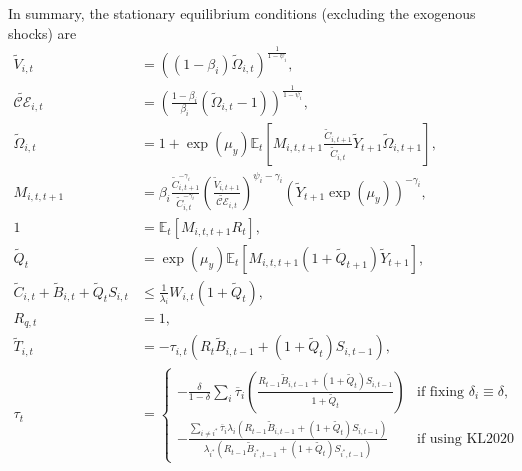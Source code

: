 \documentclass[12 pt, oneside]{article}
\theoremstyle{definition}
\theoremstyle{definition}
\theoremstyle{definition}
\newcommand{\E}{\mathbb{E}}
\newcommand{\calC}{\mathcal{C}}
\newcommand{\calE}{\mathcal{E}}
\begin{document}
In summary, the stationary equilibrium conditions (excluding the exogenous shocks) are
\begin{align}
  \label{eq:epstein zin defn eqm stat}
  \tilde{V}_{i, t} & = ((1 - \beta_i)\tilde{\Omega}_{i, t})^{\frac{1}{1 - \psi_i}},\\
  \label{eq:certainty equivalent eqm stat}
  \tilde{\calC\calE}_{i, t} & = \left(\frac{1 - \beta_i}{\beta_i}(\tilde{\Omega}_{i, t} - 1)\right)^{\frac{1}{1 - \psi_i}},\\
  \label{eq:epstein zin wealth recursion eqm stat}
  \tilde{\Omega}_{i, t} & = 1 + \exp(\mu_y)\E_t\left[M_{i, t, t + 1}\frac{\tilde{C}_{i, t + 1}}{\tilde{C}_{i, t}}\tilde{Y}_{t + 1}\tilde{\Omega}_{i, t + 1}\right],\\
  \label{eq:stochastic discount factor eqm stat}
  M_{i, t, t + 1} & = \beta_i\frac{\tilde{C}_{i, t + 1}^{- \gamma_i } }{\tilde{C}_{i, t}^{-\gamma_i} }\left(\frac{\tilde{V}_{i, t + 1}}{\tilde{\calC\calE}_{i, t}}\right)^{ \psi_i - \gamma_i}\left(\tilde{Y}_{t + 1}\exp(\mu_y)\right)^{-\gamma_i},\\
  \label{eq:euler eqn eqm stat}
  1 & = \E_t\left[M_{i, t, t + 1}R_t\right],\\
  \label{eq:tree asset pricing eqm stat}
  \tilde{Q}_t & = \exp(\mu_y)\E_t[M_{i, t, t + 1}(1 + \tilde{Q}_{t + 1})\tilde{Y}_{t + 1}],\\
  \label{eq:hh budget constraint with wealth share eqm stat}
  \tilde{C}_{i, t} + \tilde{B}_{i, t} + \tilde{Q}_t S_{i, t} & \leq \frac{1}{\lambda_i} W_{i, t} (1 + \tilde{Q}_t),\\
  \label{eq:Rq defn eqm stat}
  R_{q, t} & = 1,\\
  \label{eq:net transfer rule eqm stat}
  \tilde{T}_{i, t} & = -\tau_{i, t}(R_t \tilde{B}_{i, t - 1} + (1 + \tilde{Q}_t)S_{i, t - 1}),\\
  \label{eq:common tax rate eqm stat}
  \tau_t & =
\begin{cases}
  -\frac{\delta}{1 - \delta}\sum_i\overline{\tau}_i\left(\frac{R_{t - 1}\tilde{B}_{i, t - 1} + (1 + \tilde{Q}_t)S_{i, t - 1}}{1 + \tilde{Q}_t}\right) & \text{if fixing $\delta_i \equiv \delta$,}\\
  -\frac{\sum_{i\neq i^*} \overline{\tau}_i\lambda_i(R_{t - 1} \tilde{B}_{i, t - 1} + (1 + \tilde{Q}_t)S_{i, t - 1})}{\lambda_{i^*}(R_{t - 1}\tilde{B}_{i^*, t - 1} + (1 + \tilde{Q}_t)S_{i^*, t - 1})} & \text{if using KL2020 tax rule,}
\end{cases}\\
  \label{eq:tax rate on type i eqm stat}

\end{align}
\end{document}
